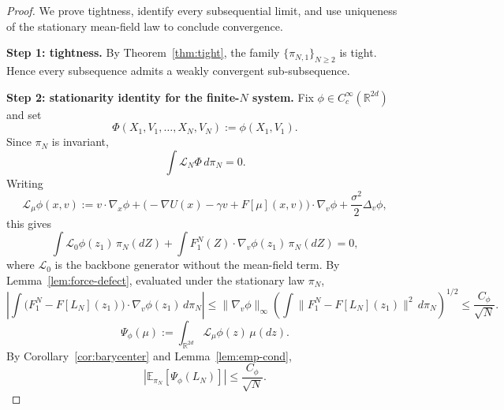 \documentclass[11pt]{article}
\theoremstyle{definition}
\theoremstyle{remark}
\newcommand{\R}{\mathbb{R}}
\newcommand{\E}{\mathbb{E}}
\begin{document}
\begin{proof}
We prove tightness, identify every subsequential limit, and use uniqueness of
the stationary mean-field law to conclude convergence.

\smallskip
\noindent
\textbf{Step 1: tightness.}
By Theorem~\ref{thm:tight}, the family $\{\pi_{N,1}\}_{N\geq2}$ is tight.
Hence every subsequence admits a weakly convergent sub-subsequence.

\smallskip
\noindent
\textbf{Step 2: stationarity identity for the finite-$N$ system.}
Fix $\phi\in C_c^\infty(\R^{2d})$ and set
\[
\Phi(X_1,V_1,\dots,X_N,V_N):=\phi(X_1,V_1).
\]
Since $\pi_N$ is invariant,
\[
\int \mathcal L_N\Phi\,d\pi_N=0.
\]
Writing
\[
\mathcal L_\mu \phi(x,v)
:=
v\cdot \nabla_x \phi
+\bigl(-\nabla U(x)-\gamma v+F[\mu](x,v)\bigr)\cdot \nabla_v \phi
+\frac{\sigma^2}{2}\Delta_v \phi,
\]
this gives
\[
\int \mathcal L_0\phi(z_1)\,\pi_N(dZ)
+
\int F_1^N(Z)\cdot \nabla_v\phi(z_1)\,\pi_N(dZ)
=0,
\]
where $\mathcal L_0$ is the backbone generator without the mean-field term.
By Lemma~\ref{lem:force-defect}, evaluated under the stationary law $\pi_N$,
\[
\left|
\int \bigl(F_1^N-F[L_N](z_1)\bigr)\cdot \nabla_v\phi(z_1)\,d\pi_N
\right|
\leq
\|\nabla_v\phi\|_\infty
\left(\int \|F_1^N-F[L_N](z_1)\|^2\,d\pi_N\right)^{1/2}
\leq
\frac{C_\phi}{\sqrt N}.
\]
\[
\Psi_\phi(\mu)
:=
\int_{\R^{2d}} \mathcal L_\mu\phi(z)\,\mu(dz).
\]
By Corollary~\ref{cor:barycenter} and Lemma~\ref{lem:emp-cond},
\begin{equation}\label{eq:stationary-approx}
\left|
\E_{\pi_N}\!\left[\Psi_\phi(L_N)\right]
\right|
\leq
\frac{C_\phi}{\sqrt N}.
\end{equation}


\end{proof}
\end{document}
